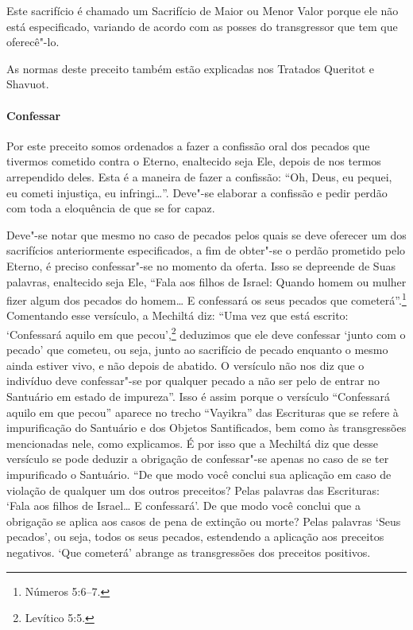 \begin{multicols}{2}
Este sacrifício é chamado um Sacrifício de Maior ou Menor Valor porque
ele não está especificado, variando de acordo com as posses do
transgressor que tem que oferecê"-lo.

As normas deste preceito também estão explicadas nos Tratados Queritot\starr{}
e Shavuot\starr.

\paragraph{Confessar}

Por este preceito somos ordenados a fazer a confissão oral dos pecados
que tivermos cometido contra o Eterno, enaltecido seja Ele, depois de
nos termos arrependido deles. Esta é a maneira de fazer a confissão:
``Oh, Deus, eu pequei, eu cometi injustiça, eu infringi\ldots{}''. Deve"-se elaborar a
confissão e pedir perdão com toda a eloquência de que se for capaz.

Deve"-se notar que mesmo no caso de pecados pelos quais se deve oferecer
um dos sacrifícios anteriormente especificados, a fim de obter"-se o
perdão prometido pelo Eterno, é preciso confessar"-se no momento da
oferta. Isso se depreende de Suas palavras, enaltecido seja Ele, ``Fala
aos filhos de Israel: Quando homem ou mulher fizer algum dos pecados do
homem\ldots{} E confessará os seus pecados que cometerá''.\footnote{Números 5:6--7.}
Comentando esse versículo, a Mechiltá\starr{} diz: ``Uma vez que está escrito:
`Confessará aquilo em que pecou',\footnote{Levítico 5:5.} deduzimos que ele deve
confessar `junto com o pecado' que cometeu, ou seja, junto ao sacrifício
de pecado enquanto o mesmo ainda estiver vivo, e não depois de abatido.
O versículo não nos diz que o indivíduo deve confessar"-se por qualquer
pecado a não ser pelo de entrar no Santuário em estado de impureza''.
Isso é assim porque o versículo ``Confessará aquilo em que pecou''
aparece no trecho ``Vayikra'' das Escrituras que se refere à
impurificação do Santuário e dos Objetos Santificados, bem como às
transgressões mencionadas nele, como explicamos. É por isso que a
Mechiltá\starr{} diz que desse versículo se pode deduzir a obrigação de
confessar"-se apenas no caso de se ter impurificado o Santuário. ``De que
modo você conclui sua aplicação em caso de violação de qualquer um dos
outros preceitos? Pelas palavras das Escrituras: `Fala aos filhos de
Israel\ldots{} E confessará'. De que modo você conclui que a obrigação se
aplica aos casos de pena de extinção ou morte? Pelas palavras `Seus
pecados', ou seja, todos os seus pecados, estendendo a aplicação aos
preceitos negativos. `Que cometerá' abrange as transgressões dos
preceitos positivos.


\end{multicols}

